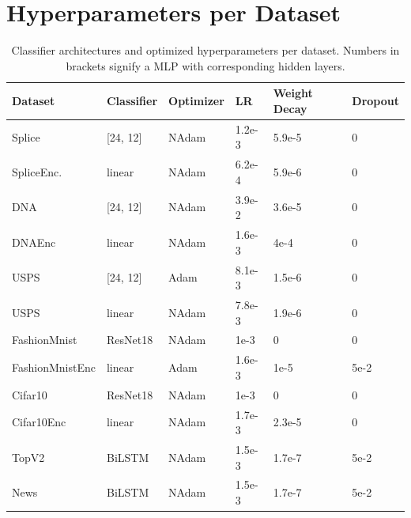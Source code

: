 \documentclass[]{article}
\begin{document}
\section{Hyperparameters per Dataset}\label{app:hyperparameters}
\begin{table}[H]
	\centering
	\begin{tabular}{l || l | l l l l}
		Dataset & Classifier & Optimizer & LR & Weight Decay & Dropout \\
		\hline
		Splice & [24, 12] & NAdam & 1.2e-3 & 5.9e-5 & 0 \\
		SpliceEnc. & linear & NAdam & 6.2e-4 & 5.9e-6 & 0 \\
		DNA & [24, 12] & NAdam & 3.9e-2 & 3.6e-5 & 0 \\
		DNAEnc & linear & NAdam & 1.6e-3 & 4e-4 & 0 \\
		USPS & [24, 12] & Adam & 8.1e-3 & 1.5e-6 & 0 \\
		USPS & linear & NAdam & 7.8e-3 & 1.9e-6 & 0 \\
		FashionMnist & ResNet18 & NAdam & 1e-3 & 0 & 0 \\
		FashionMnistEnc & linear & Adam & 1.6e-3 & 1e-5 & 5e-2 \\
		Cifar10 & ResNet18 & NAdam & 1e-3 & 0 & 0 \\
		Cifar10Enc & linear & NAdam & 1.7e-3 & 2.3e-5 & 0 \\
		TopV2 & BiLSTM & NAdam & 1.5e-3 & 1.7e-7 & 5e-2 \\
		News & BiLSTM & NAdam & 1.5e-3 & 1.7e-7 & 5e-2 \\
	\end{tabular}
	\caption{Classifier architectures and optimized hyperparameters per dataset. Numbers in brackets signify a MLP with corresponding hidden layers.}
	\label{tab:architectures}
\end{table}
\end{document}
